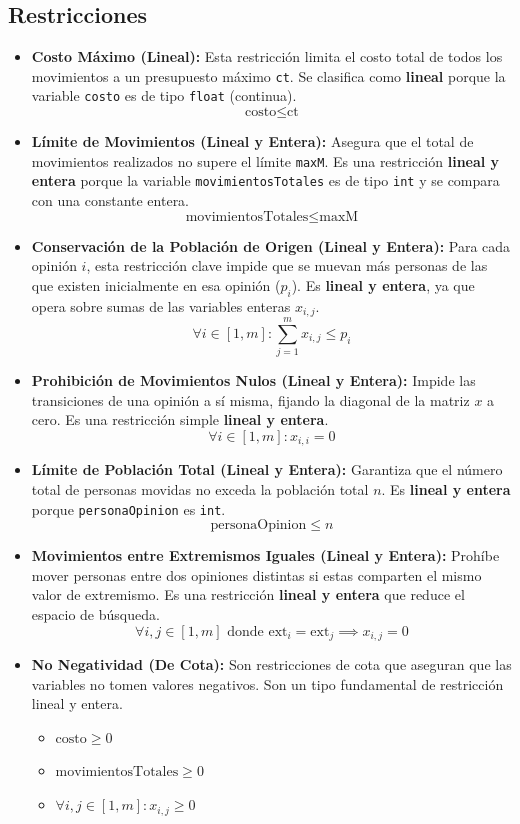 \documentclass[11pt,letter]{article}
\begin{document}
\subsection{Restricciones}
\begin{itemize}
    \item \textbf{Costo Máximo (Lineal):} 
    Esta restricción limita el costo total de todos los movimientos a un presupuesto máximo \texttt{ct}. Se clasifica como \textbf{lineal} porque la variable \texttt{costo} es de tipo \texttt{float} (continua).
    $$
    \text{costo} \le \text{ct}
    $$

    \item \textbf{Límite de Movimientos (Lineal y Entera):}
    Asegura que el total de movimientos realizados no supere el límite \texttt{maxM}. Es una restricción \textbf{lineal y entera} porque la variable \texttt{movimientosTotales} es de tipo \texttt{int} y se compara con una constante entera.
    $$
    \text{movimientosTotales} \le \text{maxM}
    $$

    \item \textbf{Conservación de la Población de Origen (Lineal y Entera):}
    Para cada opinión $i$, esta restricción clave impide que se muevan más personas de las que existen inicialmente en esa opinión ($p_i$). Es \textbf{lineal y entera}, ya que opera sobre sumas de las variables enteras $x_{i,j}$.
    $$
    \forall i \in [1, m]: \sum_{j=1}^{m} x_{i,j} \le p_i
    $$

    \item \textbf{Prohibición de Movimientos Nulos (Lineal y Entera):}
    Impide las transiciones de una opinión a sí misma, fijando la diagonal de la matriz $x$ a cero. Es una restricción simple \textbf{lineal y entera}.
    $$
    \forall i \in [1, m]: x_{i,i} = 0
    $$

    \item \textbf{Límite de Población Total (Lineal y Entera):}
    Garantiza que el número total de personas movidas no exceda la población total $n$. Es \textbf{lineal y entera} porque \texttt{personaOpinion} es \texttt{int}.
    $$
    \text{personaOpinion} \le n
    $$

    \item \textbf{Movimientos entre Extremismos Iguales (Lineal y Entera):}
    Prohíbe mover personas entre dos opiniones distintas si estas comparten el mismo valor de extremismo. Es una restricción \textbf{lineal y entera} que reduce el espacio de búsqueda.
    $$
    \forall i, j \in [1, m] \text{ donde } \text{ext}_i = \text{ext}_j \implies x_{i,j} = 0
    $$
    
    \item \textbf{No Negatividad (De Cota):}
    Son restricciones de cota que aseguran que las variables no tomen valores negativos. Son un tipo fundamental de restricción lineal y entera.
    \begin{itemize}
        \item $\text{costo} \ge 0$
        \item $\text{movimientosTotales} \ge 0$
        \item $\forall i, j \in [1, m]: x_{i,j} \ge 0$
    \end{itemize}
\end{itemize}
\end{document}

